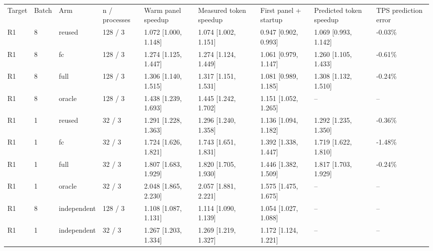 \begin{tabular}{lllllllll}
\hline
Target & Batch & Arm & n / processes & Warm panel speedup & Measured token speedup & First panel + startup & Predicted token speedup & TPS prediction error \\
R1 & 8 & reused & 128 / 3 & 1.072 [1.000, 1.148] & 1.074 [1.002, 1.151] & 0.947 [0.902, 0.993] & 1.069 [0.993, 1.142] & -0.03\% \\
R1 & 8 & fc & 128 / 3 & 1.274 [1.125, 1.447] & 1.274 [1.124, 1.449] & 1.061 [0.979, 1.147] & 1.260 [1.105, 1.433] & -0.61\% \\
R1 & 8 & full & 128 / 3 & 1.306 [1.140, 1.515] & 1.317 [1.151, 1.531] & 1.081 [0.989, 1.185] & 1.308 [1.132, 1.510] & -0.24\% \\
R1 & 8 & oracle & 128 / 3 & 1.438 [1.239, 1.693] & 1.445 [1.242, 1.702] & 1.151 [1.052, 1.265] & -- & -- \\
R1 & 1 & reused & 32 / 3 & 1.291 [1.228, 1.363] & 1.296 [1.240, 1.358] & 1.136 [1.094, 1.182] & 1.292 [1.235, 1.350] & -0.36\% \\
R1 & 1 & fc & 32 / 3 & 1.724 [1.626, 1.821] & 1.743 [1.651, 1.831] & 1.392 [1.338, 1.447] & 1.719 [1.622, 1.810] & -1.48\% \\
R1 & 1 & full & 32 / 3 & 1.807 [1.683, 1.929] & 1.820 [1.705, 1.930] & 1.446 [1.382, 1.509] & 1.817 [1.703, 1.929] & -0.24\% \\
R1 & 1 & oracle & 32 / 3 & 2.048 [1.865, 2.230] & 2.057 [1.881, 2.221] & 1.575 [1.475, 1.675] & -- & -- \\
R1 & 8 & independent & 128 / 3 & 1.108 [1.087, 1.131] & 1.114 [1.090, 1.139] & 1.054 [1.027, 1.088] & -- & -- \\
R1 & 1 & independent & 32 / 3 & 1.267 [1.203, 1.334] & 1.269 [1.219, 1.327] & 1.172 [1.124, 1.221] & -- & -- \\
\hline
\end{tabular}
